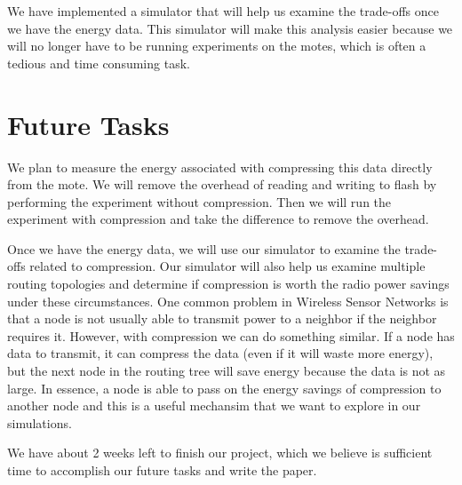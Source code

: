 \documentclass[10pt]{article}
\begin{document}
We have implemented a simulator that will help us examine the
trade-offs once we have the energy data. This simulator will make this
analysis easier because we will no longer have to be running
experiments on the motes, which is often a tedious and time consuming
task. 

\section{Future Tasks}

We plan to measure the energy associated with compressing this data
directly from the mote. We will remove the overhead of reading and
writing to flash by performing the experiment without
compression. Then we will run the experiment with compression and take
the difference to remove the overhead.

Once we have the energy data, we will use our simulator to examine the
trade-offs related to compression. Our simulator will also help us
examine multiple routing topologies and determine if compression is
worth the radio power savings under these circumstances. One common
problem in Wireless Sensor Networks is that a node is not usually able
to transmit power to a neighbor if the neighbor requires it. However,
with compression we can do something similar. If a node has data to
transmit, it can compress the data (even if it will waste more
energy), but the next node in the routing tree will save energy
because the data is not as large. In essence, a node is able to pass
on the energy savings of compression to another node and this is a
useful mechansim that we want to explore in our simulations. 

We have about 2 weeks left to finish our project, which we believe is
sufficient time to accomplish our future tasks and write the paper.


%
%
\end{document}
